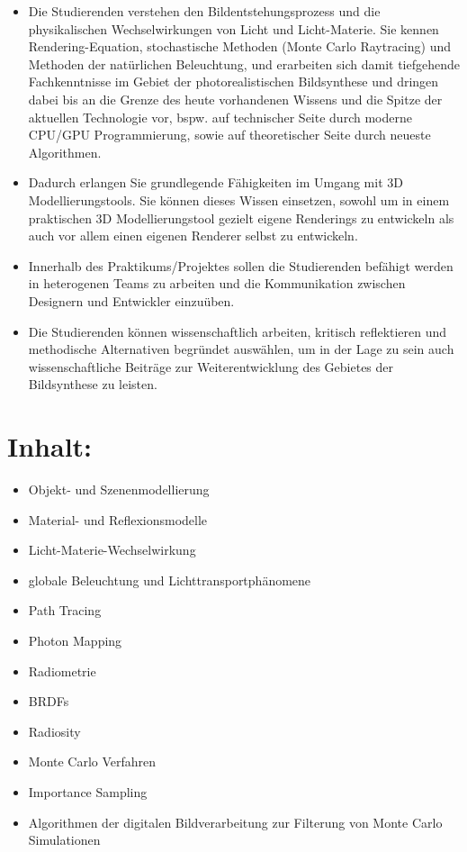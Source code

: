 \begin{itemize}
\tightlist
\item
  Die Studierenden verstehen den Bildentstehungsprozess und die
  physikalischen Wechselwirkungen von Licht und Licht-Materie. Sie
  kennen Rendering-Equation, stochastische Methoden (Monte Carlo
  Raytracing) und Methoden der natürlichen Beleuchtung, und erarbeiten
  sich damit tiefgehende Fachkenntnisse im Gebiet der photorealistischen
  Bildsynthese und dringen dabei bis an die Grenze des heute vorhandenen
  Wissens und die Spitze der aktuellen Technologie vor, bspw. auf
  technischer Seite durch moderne CPU/GPU Programmierung, sowie auf
  theoretischer Seite durch neueste Algorithmen.
\item
  Dadurch erlangen Sie grundlegende Fähigkeiten im Umgang mit 3D
  Modellierungstools. Sie können dieses Wissen einsetzen, sowohl um in
  einem praktischen 3D Modellierungstool gezielt eigene Renderings zu
  entwickeln als auch vor allem einen eigenen Renderer selbst zu
  entwickeln.
\item
  Innerhalb des Praktikums/Projektes sollen die Studierenden befähigt
  werden in heterogenen Teams zu arbeiten und die Kommunikation zwischen
  Designern und Entwickler einzuüben.
\item
  Die Studierenden können wissenschaftlich arbeiten, kritisch
  reflektieren und methodische Alternativen begründet auswählen, um in
  der Lage zu sein auch wissenschaftliche Beiträge zur Weiterentwicklung
  des Gebietes der Bildsynthese zu leisten.
\end{itemize}

\section*{Inhalt:}\label{inhalt-16}

\begin{itemize}
\tightlist
\item
  Objekt- und Szenenmodellierung
\item
  Material- und Reflexionsmodelle
\item
  Licht-Materie-Wechselwirkung
\item
  globale Beleuchtung und Lichttransportphänomene
\item
  Path Tracing
\item
  Photon Mapping
\item
  Radiometrie
\item
  BRDFs
\item
  Radiosity
\item
  Monte Carlo Verfahren
\item
  Importance Sampling
\item
  Algorithmen der digitalen Bildverarbeitung zur Filterung von Monte
  Carlo Simulationen
\end{itemize}

